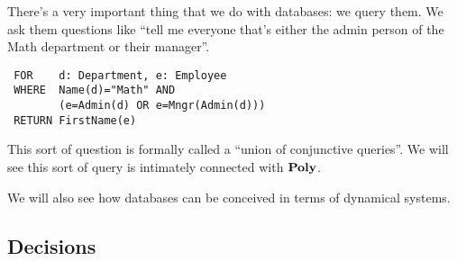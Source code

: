 \documentclass[DynamicalBook]{subfiles}
\begin{document}
There's a very important thing that we do with databases: we query them. We ask them questions like ``tell me everyone that's either the admin person of the Math department or their manager''.
\begin{verbatim}
 FOR    d: Department, e: Employee
 WHERE  Name(d)="Math" AND
        (e=Admin(d) OR e=Mngr(Admin(d)))
 RETURN FirstName(e)
\end{verbatim}
This sort of question is formally called a ``union of conjunctive queries''. We will see this sort of query is intimately connected with $\textbf{Poly}$.

We will also see how databases can be conceived in terms of dynamical systems.

\subsection{Decisions}
\end{document}
